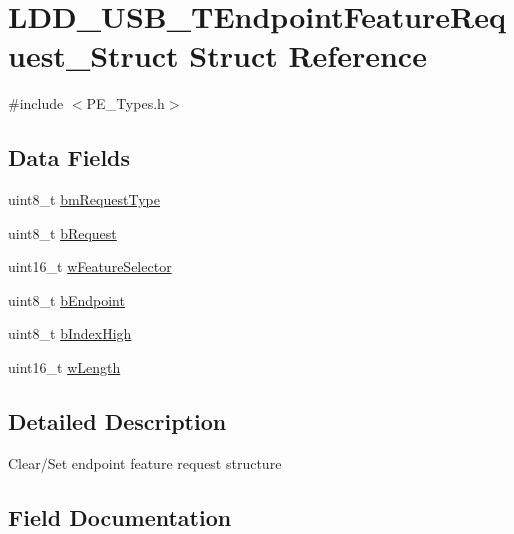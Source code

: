 \hypertarget{struct_l_d_d___u_s_b___t_endpoint_feature_request___struct}{}\section{L\+D\+D\+\_\+\+U\+S\+B\+\_\+\+T\+Endpoint\+Feature\+Request\+\_\+\+Struct Struct Reference}
\label{struct_l_d_d___u_s_b___t_endpoint_feature_request___struct}


{\ttfamily \#include $<$P\+E\+\_\+\+Types.\+h$>$}

\subsection*{Data Fields}
\begin{DoxyCompactItemize}
\item 
uint8\+\_\+t \hyperlink{struct_l_d_d___u_s_b___t_endpoint_feature_request___struct_adc137c604066ff6d3c614dbaa2cb225f}{bm\+Request\+Type}
\item 
uint8\+\_\+t \hyperlink{struct_l_d_d___u_s_b___t_endpoint_feature_request___struct_acd2dcd4a8762d22f84cfe3b9d9607a25}{b\+Request}
\item 
uint16\+\_\+t \hyperlink{struct_l_d_d___u_s_b___t_endpoint_feature_request___struct_aa026e7ce420430dc65a72dcc10337553}{w\+Feature\+Selector}
\item 
uint8\+\_\+t \hyperlink{struct_l_d_d___u_s_b___t_endpoint_feature_request___struct_a411af4337f39b9553d65d73bee6af5ec}{b\+Endpoint}
\item 
uint8\+\_\+t \hyperlink{struct_l_d_d___u_s_b___t_endpoint_feature_request___struct_aeec172fdf61100889cd7f70958283f48}{b\+Index\+High}
\item 
uint16\+\_\+t \hyperlink{struct_l_d_d___u_s_b___t_endpoint_feature_request___struct_aec7dc034039bc4deb5c811afac0686a5}{w\+Length}
\end{DoxyCompactItemize}


\subsection{Detailed Description}
Clear/\+Set endpoint feature request structure 

\subsection{Field Documentation}
\hypertarget{struct_l_d_d___u_s_b___t_endpoint_feature_request___struct_a411af4337f39b9553d65d73bee6af5ec}{}
